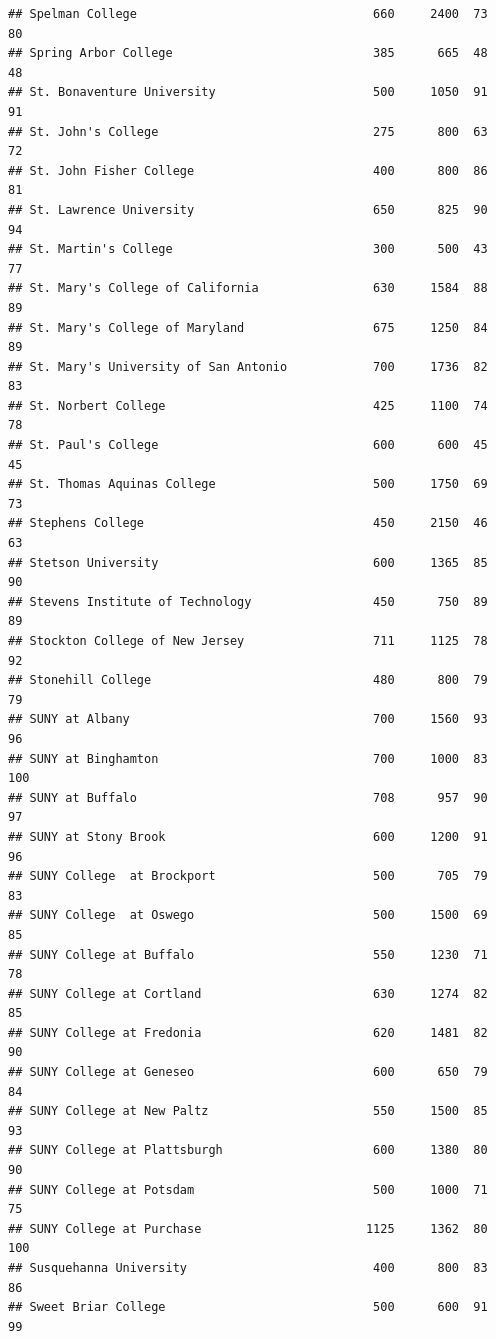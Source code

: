 \documentclass[
]{article}
\begin{document}
\begin{verbatim}
## Spelman College                                 660     2400  73       80
## Spring Arbor College                            385      665  48       48
## St. Bonaventure University                      500     1050  91       91
## St. John's College                              275      800  63       72
## St. John Fisher College                         400      800  86       81
## St. Lawrence University                         650      825  90       94
## St. Martin's College                            300      500  43       77
## St. Mary's College of California                630     1584  88       89
## St. Mary's College of Maryland                  675     1250  84       89
## St. Mary's University of San Antonio            700     1736  82       83
## St. Norbert College                             425     1100  74       78
## St. Paul's College                              600      600  45       45
## St. Thomas Aquinas College                      500     1750  69       73
## Stephens College                                450     2150  46       63
## Stetson University                              600     1365  85       90
## Stevens Institute of Technology                 450      750  89       89
## Stockton College of New Jersey                  711     1125  78       92
## Stonehill College                               480      800  79       79
## SUNY at Albany                                  700     1560  93       96
## SUNY at Binghamton                              700     1000  83      100
## SUNY at Buffalo                                 708      957  90       97
## SUNY at Stony Brook                             600     1200  91       96
## SUNY College  at Brockport                      500      705  79       83
## SUNY College  at Oswego                         500     1500  69       85
## SUNY College at Buffalo                         550     1230  71       78
## SUNY College at Cortland                        630     1274  82       85
## SUNY College at Fredonia                        620     1481  82       90
## SUNY College at Geneseo                         600      650  79       84
## SUNY College at New Paltz                       550     1500  85       93
## SUNY College at Plattsburgh                     600     1380  80       90
## SUNY College at Potsdam                         500     1000  71       75
## SUNY College at Purchase                       1125     1362  80      100
## Susquehanna University                          400      800  83       86
## Sweet Briar College                             500      600  91       99

\end{verbatim}
\end{document}
